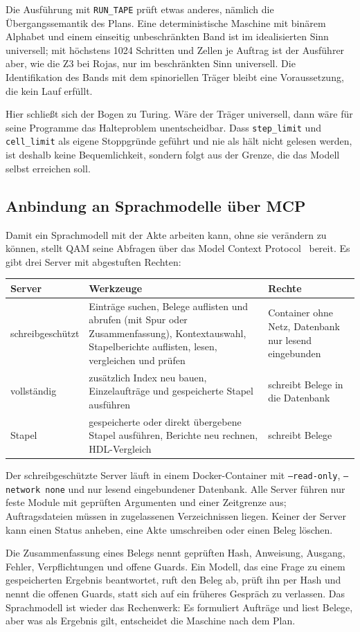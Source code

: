 Die Ausführung mit \texttt{RUN\_TAPE} prüft etwas anderes, nämlich die Übergangssemantik des Plans. Eine deterministische Maschine mit
binärem Alphabet und einem einseitig unbeschränkten Band ist im idealisierten Sinn universell; mit höchstens 1024 Schritten und Zellen je
Auftrag ist der Ausführer aber, wie die Z3 bei Rojas, nur im beschränkten Sinn universell. Die Identifikation des Bands mit dem spinoriellen
Träger bleibt eine Voraussetzung, die kein Lauf erfüllt.

Hier schließt sich der Bogen zu Turing. Wäre der Träger universell, dann wäre für seine Programme das Halteproblem unentscheidbar. Dass
\texttt{step\_limit} und \texttt{cell\_limit} als eigene Stoppgründe geführt und nie als \glqq hält nicht\grqq{} gelesen werden, ist deshalb
keine Bequemlichkeit, sondern folgt aus der Grenze, die das Modell selbst erreichen soll.

\subsection{Anbindung an Sprachmodelle über MCP}\label{sec:mcp}

Damit ein Sprachmodell mit der Akte arbeiten kann, ohne sie verändern zu können, stellt QAM seine Abfragen über das Model Context
Protocol~\cite{mcp} bereit. Es gibt drei Server mit abgestuften Rechten:
\begin{center}
\small
\begin{tabular}{@{}p{}p{}p{}@{}}
\toprule
Server & Werkzeuge & Rechte\\
\midrule
schreibgeschützt & Einträge suchen, Belege auflisten und abrufen (mit Spur oder Zusammenfassung), Kontextauswahl, Stapelberichte auflisten, lesen, vergleichen und prüfen & Container ohne Netz, Datenbank nur lesend eingebunden\\
vollständig & zusätzlich Index neu bauen, Einzelaufträge und gespeicherte Stapel ausführen & schreibt Belege in die Datenbank\\
Stapel & gespeicherte oder direkt übergebene Stapel ausführen, Berichte neu rechnen, HDL-Vergleich & schreibt Belege\\
\bottomrule
\end{tabular}
\end{center}
Der schreibgeschützte Server läuft in einem Docker-Container mit \texttt{--read-only}, \texttt{--network none} und nur lesend
eingebundener Datenbank. Alle Server führen nur feste Module mit geprüften Argumenten und einer Zeitgrenze aus; Auftragsdateien müssen in zugelassenen
Verzeichnissen liegen. Keiner der Server kann einen Status anheben, eine Akte umschreiben oder einen Beleg löschen.

Die Zusammenfassung eines Belegs nennt geprüften Hash, Anweisung, Ausgang, Fehler, Verpflichtungen und offene Guards. Ein Modell, das
eine Frage zu einem gespeicherten Ergebnis beantwortet, ruft den Beleg ab, prüft ihn per Hash und nennt die offenen Guards, statt sich auf
ein früheres Gespräch zu verlassen. Das Sprachmodell ist wieder das Rechenwerk: Es formuliert Aufträge und liest Belege, aber was als
Ergebnis gilt, entscheidet die Maschine nach dem Plan.
